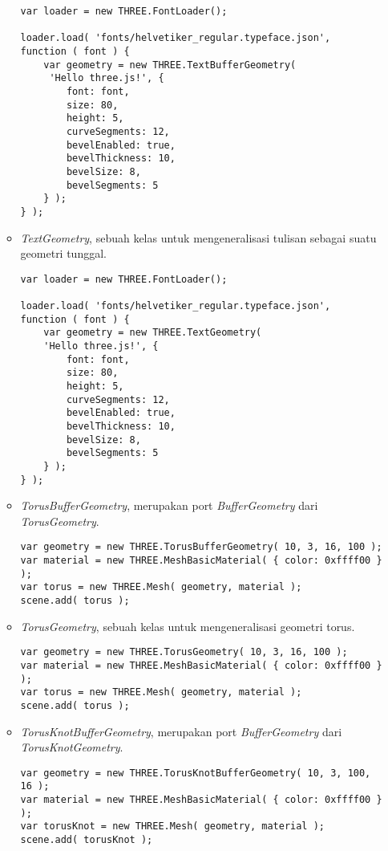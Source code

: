 \begin{itemize}
\begin{itemize}
\begin{lstlisting}
var loader = new THREE.FontLoader();

loader.load( 'fonts/helvetiker_regular.typeface.json',
function ( font ) {
	var geometry = new THREE.TextBufferGeometry(
	 'Hello three.js!', {
		font: font,
		size: 80,
		height: 5,
		curveSegments: 12,
		bevelEnabled: true,
		bevelThickness: 10,
		bevelSize: 8,
		bevelSegments: 5
	} );
} );
\end{lstlisting}

	\item {\it TextGeometry},  sebuah kelas untuk mengeneralisasi tulisan sebagai suatu geometri tunggal.
	
\begin{lstlisting}
var loader = new THREE.FontLoader();

loader.load( 'fonts/helvetiker_regular.typeface.json', 
function ( font ) {
	var geometry = new THREE.TextGeometry(
	'Hello three.js!', {
		font: font,
		size: 80,
		height: 5,
		curveSegments: 12,
		bevelEnabled: true,
		bevelThickness: 10,
		bevelSize: 8,
		bevelSegments: 5
	} );
} );
\end{lstlisting}

	\item {\it TorusBufferGeometry}, merupakan port {\it BufferGeometry} dari {\it TorusGeometry}.
	
\begin{lstlisting}
var geometry = new THREE.TorusBufferGeometry( 10, 3, 16, 100 );
var material = new THREE.MeshBasicMaterial( { color: 0xffff00 } );
var torus = new THREE.Mesh( geometry, material );
scene.add( torus );
\end{lstlisting}

	\item {\it TorusGeometry}, sebuah kelas untuk mengeneralisasi geometri torus.
	
\begin{lstlisting}
var geometry = new THREE.TorusGeometry( 10, 3, 16, 100 );
var material = new THREE.MeshBasicMaterial( { color: 0xffff00 } );
var torus = new THREE.Mesh( geometry, material );
scene.add( torus );
\end{lstlisting}

	\item {\it TorusKnotBufferGeometry}, merupakan port {\it BufferGeometry} dari {\it TorusKnotGeometry}.
	
\begin{lstlisting}
var geometry = new THREE.TorusKnotBufferGeometry( 10, 3, 100, 16 );
var material = new THREE.MeshBasicMaterial( { color: 0xffff00 } );
var torusKnot = new THREE.Mesh( geometry, material );
scene.add( torusKnot );
\end{lstlisting}


\end{itemize}
\end{itemize}
